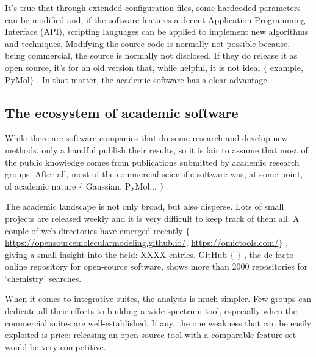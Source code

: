 It’s true that through extended configuration files, some hardcoded parameters can be modified and, if the software features a decent Application Programming Interface (API), scripting languages can be applied to implement new algorithms and techniques. Modifying the source code is normally not possible because, being commercial, the source is normally not disclosed. If they do release it as open source, it’s for an old version that, while helpful, it is not ideal $ \{ $ example, PyMol$ \} $ . In that matter, the academic software has a clear advantage.

\subsection{The ecosystem of academic software}
While there are software companies that do some research and develop new methods, only a handful publish their results, so it is fair to assume that most of the public knowledge comes from publications submitted by academic research groups. After all, most of the commercial scientific software was, at some point, of academic nature $ \{ $ Gaussian, PyMol$ \ldots $ $ \} $ .

The academic landscape is not only broad, but also disperse. Lots of small projects are released weekly and it is very difficult to keep track of them all. A couple of web directories have emerged recently $ \{ $ \href{https://opensourcemolecularmodeling.github.io/}{https://opensourcemolecularmodeling.github.io/}, \href{https://omictools.com/}{https://omictools.com/}$ \} $ , giving a small insight into the field: XXXX entries. GitHub $ \{ $ $ \} $ , the de-facto online repository for open-source software, shows more than 2000 repositories for ‘chemistry’ searches.

When it comes to integrative suites, the analysis is much simpler. Few groups can dedicate all their efforts to building a wide-spectrum tool, especially when the commercial suites are well-established. If any, the one weakness that can be easily exploited is price: releasing an open-source tool with a comparable feature set would be very competitive.

